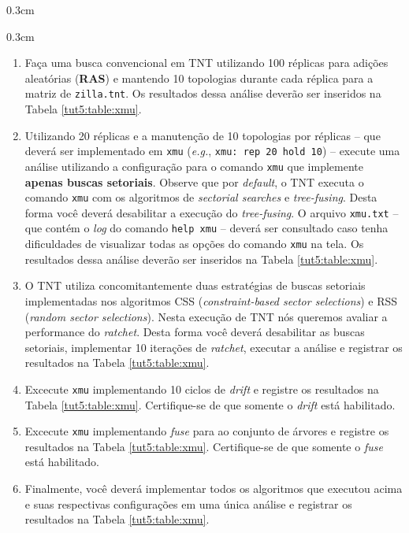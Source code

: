 \begin{refsection}
\begin {myindentpar}{0.3cm}
\begin{enumerate}[\itshape i.]
 \begin {myindentpar}{0.3cm}
  \begin{enumerate}[\itshape a.]
   \item{Faça uma busca convencional em TNT utilizando 100 réplicas para adições aleatórias (\textbf{RAS}) e mantendo 10 topologias durante cada réplica para a matriz de \texttt{zilla.tnt}. Os resultados dessa análise deverão ser inseridos na Tabela \ref{tut5:table:xmu}.}
    \item{Utilizando 20 réplicas e a manutenção de 10 topologias por réplicas -- que deverá ser implementado em \texttt{xmu} (\textit{e.g.}, \texttt{xmu: rep 20 hold 10}) -- execute uma análise utilizando a configuração para o comando \texttt{xmu} que implemente \textbf{apenas buscas setoriais}. Observe que por \textit{default}, o TNT executa o comando \texttt{xmu} com os algoritmos de \textit{sectorial searches} e \textit{tree-fusing}. Desta forma você deverá desabilitar a execução do \textit{tree-fusing}. O arquivo \texttt{xmu.txt} -- que contém o \textit{log} do comando \texttt{help xmu} -- deverá ser consultado caso tenha dificuldades de visualizar todas as opções do comando \texttt{xmu} na tela. Os resultados dessa análise deverão ser inseridos na Tabela \ref{tut5:table:xmu}.}
    \item{O TNT utiliza concomitantemente duas estratégias de buscas setoriais implementadas nos algoritmos CSS (\textit{constraint-based sector selections}) e RSS (\textit{random sector selections}). Nesta execução de TNT nós queremos avaliar a performance do \textit{ratchet}. Desta forma você deverá desabilitar as buscas setoriais, implementar 10 iterações de \textit{ratchet}, executar a análise e registrar os resultados na Tabela \ref{tut5:table:xmu}.}
    \item{Excecute \texttt{xmu} implementando 10 ciclos de \textit{drift} e registre os resultados na Tabela \ref{tut5:table:xmu}. Certifique-se de que somente o \textit{drift} está habilitado.}
    \item{Excecute \texttt{xmu} implementando \textit{fuse} para ao conjunto de árvores e registre os resultados na Tabela \ref{tut5:table:xmu}. Certifique-se de que somente o \textit{fuse} está habilitado.}
    \item{Finalmente, você deverá implementar todos os algoritmos que executou acima e suas respectivas configurações em uma única análise e registrar os resultados na Tabela \ref{tut5:table:xmu}.}

  \end{enumerate}
 \end{myindentpar}
\pagestyle{fancy}
\begin{center}


\end{center}
\end{enumerate}
\end{myindentpar}
\end{refsection}
